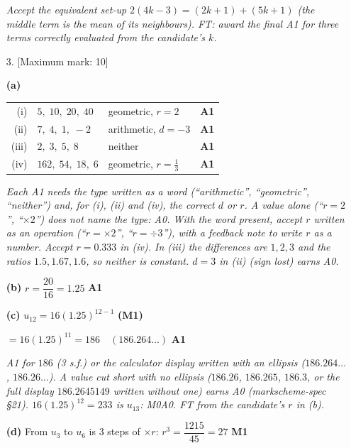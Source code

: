 \documentclass[12pt, twoside]{article}
\begin{document}
\begin{enumerate}[itemsep=0.3cm]
\emph{Accept the equivalent set-up $2(4k - 3) = (2k + 1) + (5k + 1)$
(the middle term is the mean of its neighbours). FT: award the final A1
for three terms correctly evaluated from the candidate's $k$.}

\newpage

\item[3.] [Maximum mark: 10]

\textbf{(a)}

\begin{tabular}{rlll}
(i) & $5,\; 10,\; 20,\; 40$ & geometric, $r = 2$ & \textbf{A1} \\
(ii) & $7,\; 4,\; 1,\; -2$ & arithmetic, $d = -3$ & \textbf{A1} \\
(iii) & $2,\; 3,\; 5,\; 8$ & neither & \textbf{A1} \\
(iv) & $162,\; 54,\; 18,\; 6$ & geometric, $r = \frac{1}{3}$ & \textbf{A1} \\
\end{tabular}

\emph{Each A1 needs the type written as a word (``arithmetic'',
``geometric'', ``neither'') and, for (i), (ii) and (iv), the correct $d$ or
$r$. A value alone (``$r = 2$'', ``$\times 2$'') does not name the type: A0.
With the word present, accept $r$ written as an operation (``$r = \times 2$'',
``$r = \div 3$''), with a feedback note to write $r$ as a number. Accept $r = 0.333$ in (iv). In (iii) the differences are $1, 2,
3$ and the ratios $1.5, 1.67, 1.6$, so neither is constant. $d = 3$ in
(ii) (sign lost) earns A0.}

\medskip

\textbf{(b)} $r = \dfrac{20}{16} = 1.25$ \hfill \textbf{A1}

\medskip

\textbf{(c)} $u_{12} = 16(1.25)^{12 - 1}$ \hfill \textbf{(M1)}

$= 16(1.25)^{11} = 186 \quad (186.264\ldots)$ \hfill \textbf{A1}

\emph{A1 for $186$ (3 s.f.) or the calculator display written with an
ellipsis ($186.264\ldots$, $186.26\ldots$). A value cut short with no
ellipsis ($186.26$, $186.265$, $186.3$, or the full display $186.2645149$
written without one) earns A0 (markscheme-spec §21). $16(1.25)^{12} = 233$ is $u_{13}$:
M0A0. FT from the candidate's $r$ in (b).}

\medskip

\textbf{(d)} From $u_{3}$ to $u_{6}$ is $3$ steps of $\times r$:
$r^{3} = \dfrac{1215}{45} = 27$ \hfill \textbf{M1}


\end{enumerate}
\end{document}

